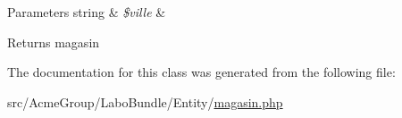 \begin{DoxyParams}[1]{Parameters}
string & {\em \$ville} & \\
\hline
\end{DoxyParams}
\begin{DoxyReturn}{Returns}
magasin 
\end{DoxyReturn}


The documentation for this class was generated from the following file\+:\begin{DoxyCompactItemize}
\item 
src/\+Acme\+Group/\+Labo\+Bundle/\+Entity/\hyperlink{_labo_bundle_2_entity_2magasin_8php}{magasin.\+php}\end{DoxyCompactItemize}
